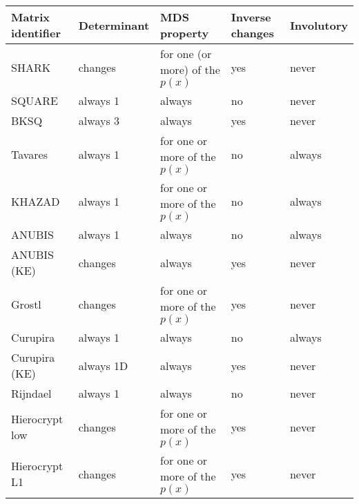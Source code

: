 \begin{footnotesize}
\begin{longtable}{|l|l|l|l|l|}
\hline
\textbf{Matrix identifier} & \textbf{Determinant} & \textbf{MDS property} & \textbf{Inverse changes} & \textbf{Involutory} \\ \hline
%
\endhead
%
SHARK                      & changes              & for one (or more) of the $p(x)$             & yes                      & never               \\ \hline
SQUARE                     & always 1             & always                & no                       & never               \\ \hline
BKSQ                       & always 3             & always                & yes                      & never               \\ \hline
Tavares                    & always 1             & for one or more of the $p(x)$             & no                       & always              \\ \hline
KHAZAD                     & always 1             & for one or more of the $p(x)$             & no                       & always              \\ \hline
ANUBIS                     & always 1             & always                & no                       & always              \\ \hline
ANUBIS (KE)                & changes              & always                & yes                      & never               \\ \hline
Grostl                     & changes              & for one or more of the $p(x)$             & yes                      & never               \\ \hline
Curupira                   & always 1             & always                & no                       & always              \\ \hline
Curupira (KE)              & always 1D            & always                & yes                      & never               \\ \hline
Rijndael                   & always 1             & always                & no                       & never               \\ \hline
Hierocrypt low             & changes              & for one or more of the $p(x)$             & yes                      & never               \\ \hline
Hierocrypt L1              & changes              & for one or more of the $p(x)$             & yes                      & never               \\ \hline

\end{longtable}
\end{footnotesize}
